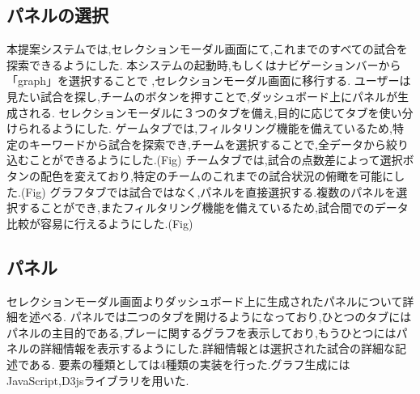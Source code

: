 \documentclass[sotsuron]{kuee}
\begin{document}
		\subsection{パネルの選択}
			本提案システムでは,セレクションモーダル画面にて,これまでのすべての試合を探索できるようにした.
			本システムの起動時,もしくはナビゲーションバーから「graph」を選択することで	,セレクションモーダル画面に移行する.
			ユーザーは見たい試合を探し,チームのボタンを押すことで,ダッシュボード上にパネルが生成される.
			セレクションモーダルに３つのタブを備え,目的に応じてタブを使い分けられるようにした.
			ゲームタブでは,フィルタリング機能を備えているため,特定のキーワードから試合を探索でき,チームを選択することで,全データから絞り込むことができるようにした.(Fig)
			チームタブでは,試合の点数差によって選択ボタンの配色を変えており,特定のチームのこれまでの試合状況の俯瞰を可能にした.(Fig)
			グラフタブでは試合ではなく,パネルを直接選択する.複数のパネルを選択することができ,またフィルタリング機能を備えているため,試合間でのデータ比較が容易に行えるようにした.(Fig)
		\subsection{パネル}
			セレクションモーダル画面よりダッシュボード上に生成されたパネルについて詳細を述べる.
			パネルでは二つのタブを開けるようになっており,ひとつのタブにはパネルの主目的である,プレーに関するグラフを表示しており,もうひとつにはパネルの詳細情報を表示するようにした.詳細情報とは選択された試合の詳細な記述である.
			要素の種類としては4種類の実装を行った.グラフ生成にはJavaScript,D3jsライブラリを用いた.
\end{document}
